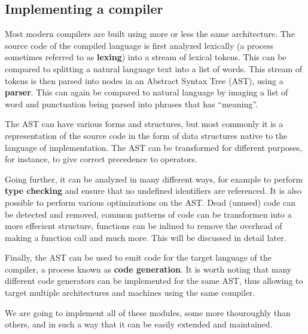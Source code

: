 \subsection{Implementing a compiler}
Most modern compilers are built using more or less the same architecture. The source code of the compiled language is first analyzed lexically (a process sometimes referred to as \textbf{lexing}) into a stream of lexical tokens. This can be compared to splitting a natural language text into a list of words. This stream of tokens is then parsed into nodes in an Abstract Syntax Tree (AST), using a \textbf{parser}. This can again be compared to natural language by imaging a list of word and punctuation being parsed into phrases that has ``meaning''.

The AST can have various forms and structures, but most commonly it is a representation of the source code in the form of data structures native to the language of implementation. The AST can be transformed for different purposes, for instance, to give correct precedence to operators.

Going further, it can be analyzed in many different ways, for example to perform \textbf{type checking} and ensure that no undefined identifiers are referenced. It is also possible to perform various optimizations on the AST. Dead (unused) code can be detected and removed, common patterns of code can be transformen into a more effecient structure, functions can be inlined to remove the overhead of making a function call and much more. This will be discussed in detail later.

Finally, the AST can be used to emit code for the target language of the compiler, a process known as \textbf{code generation}. It is worth noting that many different code generators can be implemented for the same AST, thus allowing to target multiple architectures and machines using the same compiler.

We are going to implement all of these modules, some more thouroughly
than others, and in such a way that it can be easily extended and
maintained.